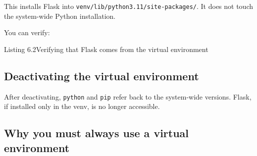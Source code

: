 \noindent{}This installs Flask into \texttt{venv/}\allowbreak{}\texttt{lib/}\allowbreak{}\texttt{python3.}\allowbreak{}\texttt{11/}\allowbreak{}\texttt{site-}\allowbreak{}\texttt{packages/}. It does not touch the system-wide Python installation.

You can verify:

\begin{codeboxcap}[short]{\textcolor{accent}{Listing 6.2}\enspace Verifying that Flask comes from the virtual environment}

\begin{Shaded}
\begin{Highlighting}[]
\NormalTok{)}
\end{Highlighting}
\end{Shaded}

\end{codeboxcap}

\subsection*{Deactivating the virtual environment}\label{06-local-dependencies:deactivating-the-virtual-environment}

\begin{codebox}[short]

\begin{Shaded}
\begin{Highlighting}[]
\end{Highlighting}
\end{Shaded}

\end{codebox}

\noindent{}After deactivating, \texttt{python} and \texttt{pip} refer back to the system-wide versions. Flask, if installed only in the venv, is no longer accessible.

\subsection*{Why you must always use a virtual environment}\label{06-local-dependencies:why-you-must-always-use-a-virtual-environment}

